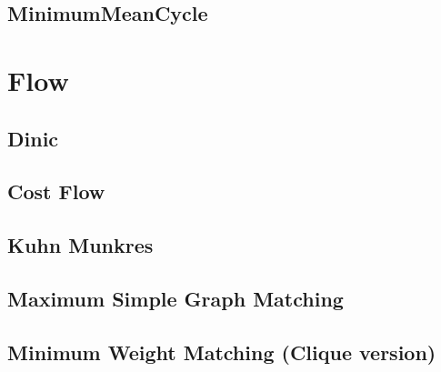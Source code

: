 \documentclass[a4paper,10pt,twocolumn,oneside]{article}
\begin{document}
\subsection{MinimumMeanCycle}


\section{Flow}
%

\subsection{Dinic} %


\subsection{Cost Flow} %


%

\subsection{Kuhn Munkres}


%

\subsection{Maximum Simple Graph Matching}


\subsection{Minimum Weight Matching (Clique version)}

\end{document}
